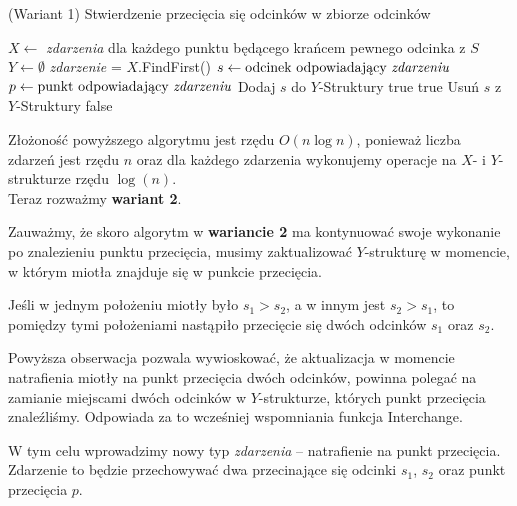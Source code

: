 \begin{algorithm}[H]
	\caption{(Wariant 1) Stwierdzenie przecięcia się odcinków w zbiorze odcinków}
	\begin{algorithmic}[1]
		\State $X \gets$ \textit{zdarzenia} dla każdego punktu będącego
		krańcem pewnego odcinka z $S$
		\State $Y \gets \emptyset$
		\State \textit{zdarzenie} = $X.$FindFirst()
		\State $s \gets \text{odcinek odpowiadający \textit{zdarzeniu}}$
		\State $p \gets \text{punkt odpowiadający \textit{zdarzeniu}}$
		\State Dodaj $s$ do $Y$-Struktury
		\State \Return true
		\EndIf
		\Else
		\State \Return true
		\EndIf
		\State Usuń $s$ z $Y$-Struktury
		\EndIf
		\EndWhile
		\State \Return false
		\EndProcedure
	\end{algorithmic}
	\label{HasIntersectingSegments1}
\end{algorithm}

Złożoność powyższego algorytmu jest rzędu $O(n\log n)$, ponieważ liczba zdarzeń jest
rzędu $n$ oraz dla każdego zdarzenia wykonujemy operacje na $X$- i $Y$-strukturze rzędu $\log(n)$.
\\

Teraz rozważmy \textbf{wariant 2}.

Zauważmy, że skoro algorytm w \textbf{wariancie 2} ma kontynuować swoje wykonanie po znalezieniu punktu
przecięcia, musimy zaktualizować $Y$-strukturę w momencie, w którym
miotła znajduje się w punkcie przecięcia. 

\begin{obs}
	Jeśli w jednym położeniu miotły było $s_1 > s_2$, a w innym 
	jest $s_2 > s_1$, to pomiędzy tymi położeniami nastąpiło przecięcie się
	dwóch odcinków $s_1$ oraz $s_2$.
\end{obs}

Powyższa obserwacja pozwala wywioskować, że aktualizacja w momencie 
natrafienia miotły na punkt przecięcia dwóch odcinków, powinna polegać
na zamianie miejscami dwóch odcinków w $Y$-strukturze, których punkt przecięcia znaleźliśmy. 
Odpowiada za to wcześniej wspomniania funkcja Interchange.

W tym celu wprowadzimy nowy typ \textit{zdarzenia} -- natrafienie na punkt 
przecięcia. Zdarzenie to będzie przechowywać dwa przecinające się 
odcinki $s_1$, $s_2$ oraz punkt przecięcia $p$.

